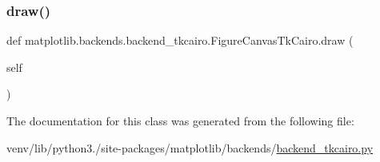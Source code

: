 \subsubsection{\texorpdfstring{draw()}{draw()}}
{\footnotesize\ttfamily def matplotlib.\+backends.\+backend\+\_\+tkcairo.\+Figure\+Canvas\+Tk\+Cairo.\+draw (\begin{DoxyParamCaption}\item[{}]{self }\end{DoxyParamCaption})}



The documentation for this class was generated from the following file\+:\begin{DoxyCompactItemize}
\item 
venv/lib/python3./site-\/packages/matplotlib/backends/\hyperlink{backend__tkcairo_8py}{backend\+\_\+tkcairo.\+py}\end{DoxyCompactItemize}
